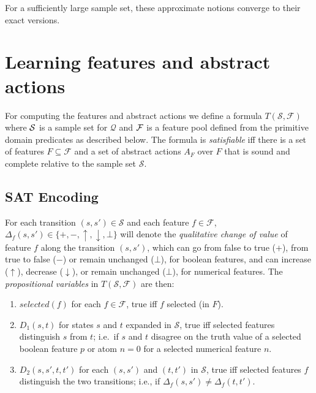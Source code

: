 \documentclass[letterpaper]{article} %
\newcommand{\Q}{\mathcal{Q}}
\newcommand{\F}{\mathcal{F}}
\renewcommand{\S}{\mathcal{S}}
\begin{document}
For a sufficiently large sample set, these approximate notions converge to their exact versions.

\section{Learning  features and  abstract actions}

For computing the features and abstract actions we define a formula
$T(\S,\F)$ where ${\cal S}$ is a sample set for $\Q$ and $\cal F$
is a feature pool defined from the primitive domain predicates
as described below. The formula is  \emph{satisfiable} iff there is a set of
features $F \subseteq \F$ and a set of abstract actions $A_F$
over $F$ that is sound and complete relative to the sample set
$\S$.


\subsection{SAT Encoding}

For each transition  $(s, s') \in \S$ and each feature $f \in \F$,
$\Delta_f(s, s') \in \{+, -, \uparrow, \downarrow, \bot\}$ will denote the
\emph{qualitative change of value} of feature $f$ along the transition $(s, s')$,
which can go from false to true ($+$), from true to false ($-$) or remain
unchanged ($\bot$), for boolean features, and can increase ($\uparrow$),
decrease ($\downarrow$), or remain unchanged ($\bot$), for numerical features.
The \emph{propositional variables} in $T(\S,\F)$ are then:
\begin{enumerate}[{\small$\bullet$}]
  \item $selected(f)$ for each $f \in \F$, true iff $f$ selected (in $F$).
  \item $D_1(s,t)$ for states $s$ and $t$ expanded in $\S$,  true iff
    selected features distinguish $s$ from $t$; i.e.\ if $s$ and $t$ disagree
    on the truth value of a selected boolean feature $p$ or atom $n=0$ for a
    selected numerical feature $n$.
  \item $D_2(s, s', t, t')$ for each $(s, s')$ and $(t, t')$ in $\S$,
    true iff selected features $f$ distinguish the two transitions; i.e., if
    $\Delta_f(s, s')\not=\Delta_f(t,t')$. 
\end{enumerate}
\end{document}
